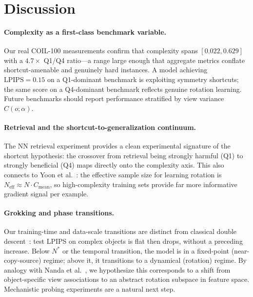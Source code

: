 \documentclass[11pt]{article}
\newcommand{\lpips}{\mathrm{LPIPS}}
\begin{document}
\section{Discussion}
\label{sec:discussion}

\paragraph{Complexity as a first-class benchmark variable.}
Our real COIL-100 measurements confirm that complexity spans $[0.022, 0.629]$
with a $4.7\times$ Q1/Q4 ratio---a range large enough that aggregate metrics
conflate shortcut-amenable and genuinely hard instances. A model achieving
$\lpips = 0.15$ on a Q1-dominant benchmark is exploiting symmetry shortcuts;
the same score on a Q4-dominant benchmark reflects genuine rotation learning.
Future benchmarks should report performance stratified by view variance
$C(o;\alpha)$.

\paragraph{Retrieval and the shortcut-to-generalization continuum.}
The NN retrieval experiment provides a clean experimental signature of the
shortcut hypothesis: the crossover from retrieval being strongly harmful (Q1)
to strongly beneficial (Q4) maps directly onto the complexity axis. This also
connects to Yoon et al.~\cite{yoon2025memorization}: the effective sample size
for learning rotation is $N_{\mathrm{eff}} \approx N \cdot C_{\mathrm{mean}}$,
so high-complexity training sets provide far more informative gradient signal
per example.

\paragraph{Grokking and phase transitions.}
Our training-time and data-scale transitions are distinct from classical double
descent~\cite{nakkiran2021descent}: test LPIPS on complex objects is flat then
drops, without a preceding increase. Below $N^*$ or the temporal transition,
the model is in a fixed-point (near-copy-source) regime; above it, it
transitions to a dynamical (rotation) regime. By analogy with Nanda et
al.~\cite{nanda2023progress}, we hypothesize this corresponds to a shift from
object-specific view associations to an abstract rotation subspace in feature
space. Mechanistic probing experiments are a natural next step.
\end{document}
